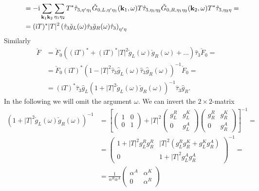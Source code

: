 \documentclass[english, parskip=full]{scrartcl}
\newcommand{\kla}{}
\newcommand{\klam}{}
\renewcommand{\i}{\text{i}}
\begin{document}
\begin{align}
&\hspace{0.5cm} = -\i \sum_{\textbf{k}_1 \textbf{k}_2 } \sum_{\eta_1\eta_2} T^\ast \hat{\tau}_{3,\eta'\eta_1} \check{G}_{0,L,\eta'\eta_1}(\textbf{k}_1, \omega) T \hat{\tau}_{3,\eta_1\eta_2} \check{G}_{0,R,\eta_1\eta_2} (\textbf{k}_2, \omega) T^\ast \hat{\tau}_{3,\eta_2\eta} = \\
&\hspace{0.5cm} = (\i T)^\ast |T|^2 \kla\left( \hat{\tau}_3 \check{g}_L(\omega) \hat{\tau}_3 \check{g}_R(\omega) \hat{\tau}_3 \right)_{\eta'\eta}
\end{align}
Similarly
\begin{align}
\check{F} &= \check{F}_0 \kla\left( (\i T)^\ast + (\i T)^\ast |T|^2 \check{g}_{L}(\omega) \check{g}_{R}(\omega) + \dots \right) \hat{\tau}_3 \check{F}_0 = \\
&= \check{F}_0 (\i T)^\ast \kla\left( 1 - |T|^2 \hat{\tau}_3 \hat{g}_L(\omega) \hat{\tau}_3 \hat{g}_R(\omega) \right)^{-1} \check{F}_0 = \\
&= (\i T)^\ast \hat{\tau}_3 \hat{g}_L \kla\left( 1 + |T|^2 \check{g}_L(\omega) \check{g}_R(\omega) \right)^{-1} \hat{\tau}_3 \hat{g}_R.
\end{align}
In the following we will omit the argument $\omega$.
We can invert the $2\times 2$-matrix
\begin{align}
\left( 1 + |T|^2 \check{g}_L(\omega) \check{g}_R(\omega) \right)^{-1} &= \klam\left[ \begin{pmatrix}
1 & 0 \\ 0 & 1
\end{pmatrix} + |T|^2 \begin{pmatrix}
g_L^R & g_L^K \\ 0 & g_L^A
\end{pmatrix} \begin{pmatrix}
g_R^R & g_R^K \\ 0 & g_R^A
\end{pmatrix} \right]^{-1} = \\
&= \begin{pmatrix}
1 + |T|^2 g_L^Rg_R^R & |T|^2 \kla\left( g_L^R g_R^K + g_L^K g_R^A \right) \\ 
0 & 1 + |T|^2g_L^A g_R^A
\end{pmatrix}^{-1} = \\
&= \frac{1}{\alpha^R \alpha^A} \begin{pmatrix}
\alpha^A & \alpha^K \\ 
0 & \alpha^R
\end{pmatrix}
\end{align}
\end{document}
